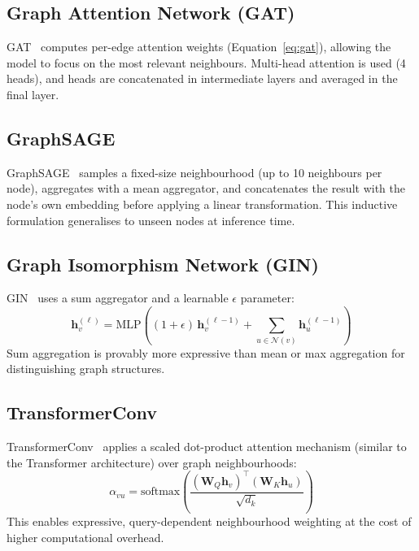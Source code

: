 \documentclass[12pt,a4paper]{article}
\begin{document}
\subsection{Graph Attention Network (GAT)}

GAT~\cite{velickovic2018} computes per-edge attention weights (Equation~\ref{eq:gat}), allowing the model to focus on the most relevant neighbours. Multi-head attention is used (4 heads), and heads are concatenated in intermediate layers and averaged in the final layer.

\subsection{GraphSAGE}

GraphSAGE~\cite{hamilton2017} samples a fixed-size neighbourhood (up to 10 neighbours per node), aggregates with a mean aggregator, and concatenates the result with the node's own embedding before applying a linear transformation. This inductive formulation generalises to unseen nodes at inference time.

\subsection{Graph Isomorphism Network (GIN)}

GIN~\cite{xu2019} uses a sum aggregator and a learnable $\epsilon$ parameter:
\begin{equation}
\mathbf{h}_v^{(\ell)} = \text{MLP}\!\left((1+\epsilon)\,\mathbf{h}_v^{(\ell-1)} + \sum_{u \in \mathcal{N}(v)}\mathbf{h}_u^{(\ell-1)}\right)
\end{equation}
Sum aggregation is provably more expressive than mean or max aggregation for distinguishing graph structures.

\subsection{TransformerConv}

TransformerConv~\cite{shi2021} applies a scaled dot-product attention mechanism (similar to the Transformer architecture) over graph neighbourhoods:
\begin{equation}
\alpha_{vu} = \text{softmax}\!\left(\frac{(\mathbf{W}_Q\mathbf{h}_v)^\top(\mathbf{W}_K\mathbf{h}_u)}{\sqrt{d_k}}\right)
\end{equation}
This enables expressive, query-dependent neighbourhood weighting at the cost of higher computational overhead.
\end{document}
